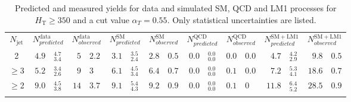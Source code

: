 \medskip
\begin{table}[!h]
  \begin{center}
    \caption{\label{tab:total_prediction} Predicted and measured yields
      for data and simulated SM, QCD and LM1 processes for $H_{\mathrm{T}} \geq 350$
      and a cut value $\alpha_{T} = 0.55$. Only statistical uncertainties
      are listed.}
    \begin{tabular}{cr@{$\ \pm\ $}lr@{$\ \pm\ $}lr@{$\ \pm\ $}lr@{$\ \pm\ $}lr@{$\ \pm\ $}lr@{$\ \pm\ $}lr@{$\ \pm\ $}lr@{$\ \pm\ $}l}
      \hline\noalign{\smallskip}
      $N_{\mathrm{jet}}$ &
      \multicolumn{2}{c}{$N^{\mathrm{data}}_{predicted}$} &
      \multicolumn{2}{c}{$N^{\mathrm{data}}_{observed}$} &
      \multicolumn{2}{c}{$N^{\mathrm{SM}}_{predicted}$} & 
      \multicolumn{2}{c}{$N^{\mathrm{SM}}_{observed}$} &
      \multicolumn{2}{c}{$N^{\mathrm{QCD}}_{predicted}$} &
      \multicolumn{2}{c}{$N^{\mathrm{QCD}}_{observed}$} & 
      \multicolumn{2}{c}{$N^{\mathrm{SM+LM1}}_{predicted}$} &  
      \multicolumn{2}{c}{$N^{\mathrm{SM+LM1}}_{observed}$} \\
      \noalign{\smallskip}\hline\noalign{\smallskip}
      2 & $4.9$&$^{4.7}_{3.4}$ & $5$&$2.2$ & $3.1$&$^{3.5}_{2.4}$ & $2.8$&$0.5$ & $0.0$&$^{0.0}_{0.0}$ & $0.0$&$0.0$ & $4.7$&$^{4.2}_{2.9}$ & $9.8$&$0.5$ \\
      $\geq$3 & $5.2$&$^{3.4}_{2.6}$ & $9$&$3$ & $6.1$&$^{4.5}_{3.4}$ & $6.4$&$0.7$ & $0.0$&$^{0.0}_{0.0}$ & $0.1$&$0.0$ & $7.2$&$^{5.3}_{4.1}$ & $18.6$&$0.7$ \\
      $\geq$2 & $9.0$&$^{4.5}_{3.8}$ & $14$&$3.7$ & $9.1$&$^{5.4}_{4.3}$ & $9.2$&$0.9$ & $0.0$&$^{0.0}_{0.0}$ & $0.1$&$0$ & $11.8$&$^{6.4}_{5.2}$ & $28.5$&$0.9$ \\
      \noalign{\smallskip}\hline
    \end{tabular}
  \end{center}
\end{table}

